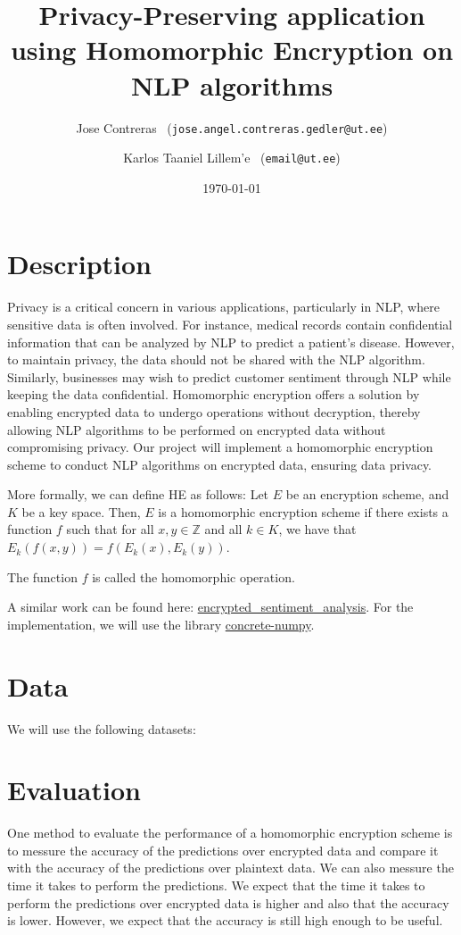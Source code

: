 \documentclass{article}
\title{Privacy-Preserving application using Homomorphic Encryption on NLP algorithms}
\author{Jose Contreras \ (\texttt{jose.angel.contreras.gedler@ut.ee}) \\
  \and Karlos Taaniel Lillem'e  \ (\texttt{email@ut.ee}) }
\date{\today}
\begin{document}
\maketitle


\section*{Description}

Privacy is a critical concern in various applications, particularly in NLP, where sensitive data is often involved. For instance, medical records contain confidential information that can be analyzed by NLP to predict a patient's disease. However, to maintain privacy, the data should not be shared with the NLP algorithm. Similarly, businesses may wish to predict customer sentiment through NLP while keeping the data confidential. Homomorphic encryption offers a solution by enabling encrypted data to undergo operations without decryption, thereby allowing NLP algorithms to be performed on encrypted data without compromising privacy. Our project will implement a homomorphic encryption scheme to conduct NLP algorithms on encrypted data, ensuring data privacy.

More formally, we can define HE as follows: Let $E$ be an encryption scheme, and $K$ be a key space. Then, $E$ is a homomorphic encryption scheme if there exists a function $f$ such that for all $x,y \in \mathbb{Z}$ and all $k \in K$, we have that $E_k(f(x,y)) = f(E_k(x), E_k(y))$.

The function $f$ is called the homomorphic operation.

A similar work can be found here: \href{https://huggingface.co/spaces/zama-fhe/encrypted\_sentiment\_analysis}{encrypted\_sentiment\_analysis}. For the implementation, we will use the library \href{https://docs.zama.ai/concrete-numpy/}{concrete-numpy}.

\section*{Data}

We will use the following datasets:




\section*{Evaluation}
One method to evaluate the performance of a homomorphic encryption scheme is to messure the accuracy of the predictions over encrypted data and compare it with the accuracy of the predictions over plaintext data. We can also messure the time it takes to perform the predictions. We expect that the time it takes to perform the predictions over encrypted data is higher and also that the accuracy is lower. However, we expect that the accuracy is still high enough to be useful.
\end{document}
